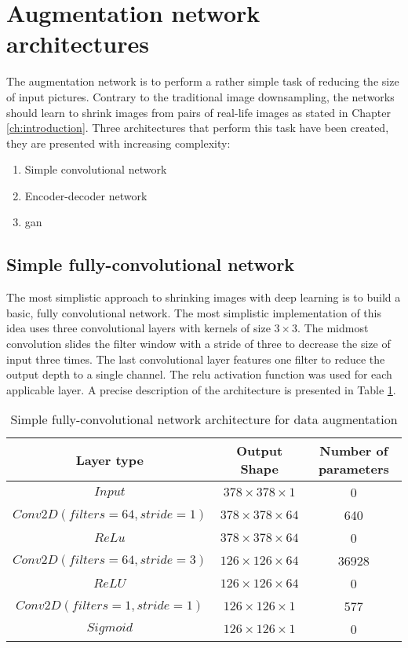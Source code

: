 \section{Augmentation network architectures}
The augmentation network is to perform a rather simple task of reducing the size of input pictures.
Contrary to the traditional image downsampling, the networks should learn to shrink images from pairs of real-life images as stated in Chapter \ref{ch:introduction}.
Three architectures that perform this task have been created, they are presented with increasing complexity:
\begin{enumerate}
	\item Simple convolutional network
	\item Encoder-decoder network
	\item \gls{gan}	
\end{enumerate}

\subsection{Simple fully-convolutional network}
The most simplistic approach to shrinking images with deep learning is to build a basic, fully convolutional network.
The most simplistic implementation of this idea uses three convolutional layers with kernels of size $ 3 \times 3 $.
The midmost convolution slides the filter window with a stride of three to decrease the size of input three times.
The last convolutional layer features one filter to reduce the output depth to a single channel.
The \gls{relu} activation function was used for each applicable layer.
A precise description of the architecture is presented in Table \ref{tab:simple-conv-arch}.
\begin{table}
    \centering
    \caption{Simple fully-convolutional network architecture for data augmentation}
    \label{tab:simple-conv-arch}
    \begin{tabular}{ccc}
        \toprule
        Layer type & Output Shape & Number of parameters \\
        \midrule
        $ Input $      & $ 378 \times 378 \times 1 $  & 0                    \\
        $ Conv2D(filters=64, stride=1) $ & $ 378 \times 378 \times 64 $ & 640 \\
        $ ReLu $ & $ 378 \times 378 \times 64 $ & 0 \\
        $ Conv2D(filters=64, stride=3) $ & $ 126 \times 126 \times 64 $ & 36928 \\
        $ ReLU $ & $ 126 \times 126 \times 64 $ & 0 \\
        $ Conv2D(filters=1, stride=1) $ & $ 126 \times 126 \times 1 $ & 577 \\
        $ Sigmoid $ & $ 126 \times 126 \times 1 $ & 0 \\
        \bottomrule
    \end{tabular}
\end{table}

